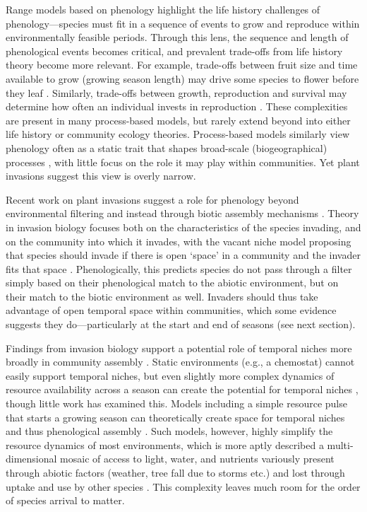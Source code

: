\documentclass[11pt]{article}
\newcommand{\R}[1]{\label{}\linelabel{#1}}
\begin{document}
Range models based on phenology highlight the life history challenges of phenology---species must fit in a sequence of events to grow and reproduce within environmentally feasible periods. Through this lens, the sequence and length of phenological events becomes critical, and prevalent trade-offs from life history theory become more relevant. For example, trade-offs between fruit size and time available to grow (growing season length) may drive some species to flower before they leaf \citep{dan2021nph}. Similarly, trade-offs between growth, reproduction and survival may determine how often an individual invests in reproduction \citep{schaffer1974optimal,law1979cost,stearns1998evolution}. These complexities are present in many process-based models, but rarely extend beyond into either life history or community ecology theories. Process-based models similarly view phenology often as a static trait that shapes broad-scale (biogeographical) processes \citep{Chuine:2010gm}, with little focus on the role it may play within communities. Yet plant invasions suggest this view is overly narrow.

Recent work on plant invasions suggest a role for phenology beyond environmental filtering and instead through biotic assembly mechanisms \citep{wolkovich2011phenology,Fridley:2012fj}. Theory in invasion biology focuses both on the characteristics of the species invading, and on the community into which it invades, with the vacant niche model proposing that species should invade if there is open `space' in a community and the invader fits that space \citep{Elton:1958bk}. Phenologically, this predicts species do not pass through a filter simply based on their phenological match to the abiotic environment, but on their match to the biotic environment as well. Invaders should thus take advantage of open temporal space within communities, which some evidence suggests they do---particularly at the start and end of seasons (see next section). 

Findings from invasion biology support a potential role of temporal niches more broadly in community assembly \citep{gotelli1996}. Static environments (e.g., a chemostat) cannot easily support temporal niches, but even slightly more complex dynamics of resource availability across a season can create the potential for temporal niches\R{morefsS} \citep[Fig. \ref{fig:resource}, and see][]{Chesson:2004eo}, \R{notincluded1S}though little work has examined this\R{notincluded1E}. Models including a simple resource pulse that starts a growing season can theoretically create space for temporal niches and thus phenological assembly \citep[discussed further in the section on coexistence, and see][]{wolkovich2021phenological}. Such models, however, highly simplify the resource dynamics of most environments, which is more aptly described a multi-dimensional mosaic of access to light, water, and nutrients variously present through abiotic factors (weather, tree fall due to storms etc.) and lost through uptake and use by other species \citep{craine2013mechanisms}. \R{morefsE}This complexity leaves much room for the order of species arrival to matter.
\end{document}
